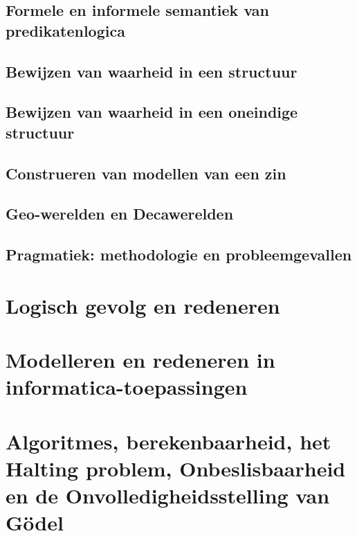 \documentclass[11pt, a4paper]{article}
\begin{document}
\subsection{Formele en informele semantiek van predikatenlogica}
\subsection{Bewijzen van waarheid in een structuur}
\subsection{Bewijzen van waarheid in een oneindige structuur}
\subsection{Construeren van modellen van een zin}
\subsection{Geo-werelden en Decawerelden}
\subsection{Pragmatiek: methodologie en probleemgevallen}

\section{Logisch gevolg en redeneren}

\section{Modelleren en redeneren in informatica-toepassingen}

\section{Algoritmes, berekenbaarheid, het Halting problem, Onbeslisbaarheid en de Onvolledigheidsstelling van G\"odel}
\end{document}
